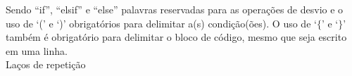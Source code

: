 \documentclass[12pt,a4paper]{article}
\begin{document}
Sendo ``if'', ``elsif'' e ``else'' palavras reservadas para as operações de desvio e o uso de `(' e `)' obrigatórios para delimitar a(s) condição(ões). O uso de `$\{$' e `$\}$' também é obrigatório para delimitar o bloco de código, mesmo que seja escrito em uma linha.\\


\hypertarget{label5}{\Large{Laços de repetição}}\\[0.3cm]
\normalsize

\end{document}
